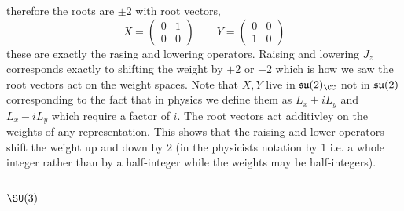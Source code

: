 \documentclass[12pt]{article}
\begin{document}
therefore the roots are $\pm 2$ with root vectors,
\[ X = \begin{pmatrix}
0 & 1
\\
0 & 0 
\end{pmatrix} 
\quad \quad 
Y = \begin{pmatrix}
0 & 0 
\\
1 & 0
\end{pmatrix} \]
these are exactly the rasing and lowering operators. Raising and lowering $J_z$ corresponds exactly to shifting the weight by $+2$ or $-2$ which is how we saw the root vectors act on the weight spaces. Note that $X,Y$ live in $\su(2)_{\CC}$ not in $\mathfrak{su}(2)$ corresponding to the fact that in physics we define them as $L_x + i L_y$ and $L_x - i L_y$ which require a factor of $i$. The root vectors act additivley on the weights of any representation. This shows that the raising and lower operators shift the weight up and down by $2$ (in the physicists notation by $1$ i.e. a whole integer rather than by a half-integer while the weights may be half-integers).
\subsection{$\SU(3)$}
\end{document}
